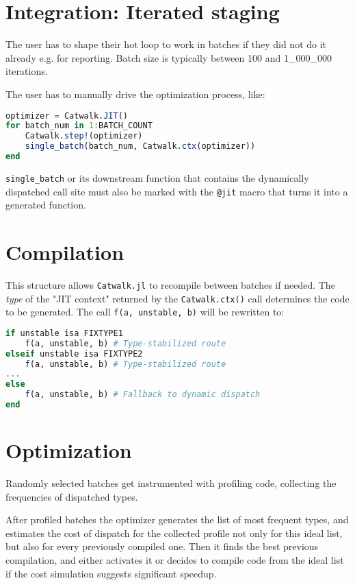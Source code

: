 \documentclass{juliacon}
\begin{document}
\section{Integration: Iterated staging}

The user has to shape their hot loop to work in batches if they did not do it already e.g. for reporting. Batch size is typically between 100 and 1\_000\_000 iterations.

The user has to manually drive the optimization process, like: 

\begin{lstlisting}[language = Julia]
optimizer = Catwalk.JIT()
for batch_num in 1:BATCH_COUNT
    Catwalk.step!(optimizer)
    single_batch(batch_num, Catwalk.ctx(optimizer))
end
\end{lstlisting}

\verb|single_batch|  or its downstream function that contains the dynamically dispatched call site must also be marked with the \verb|@jit|  macro that turns
it into a generated function.

\section {Compilation}

This structure allows \verb|Catwalk.jl| to recompile between batches if needed.
The \emph{type} of the "JIT context" returned by the \verb|Catwalk.ctx()| call
determines the code to be generated. The call \verb|f(a, unstable, b)| will 
be rewritten to:

\begin{lstlisting}[language = Julia]
if unstable isa FIXTYPE1
    f(a, unstable, b) # Type-stabilized route
elseif unstable isa FIXTYPE2
    f(a, unstable, b) # Type-stabilized route
...
else
    f(a, unstable, b) # Fallback to dynamic dispatch
end
\end{lstlisting}

\section {Optimization}

Randomly selected batches get instrumented with profiling code, collecting the frequencies of dispatched types.

After profiled batches the optimizer generates the list of most frequent types, and estimates the cost of dispatch for the collected profile not only for this ideal list, but also for every previously compiled one. Then it finds the best previous compilation,
and either activates it or decides to compile code from the ideal list if the cost simulation suggests significant speedup.
\end{document}
